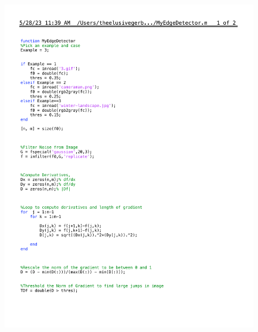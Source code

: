 \documentclass[12pt]{article}
\begin{document}
\begin{enumerate}[label=\bfseries Problem \arabic*:]
\begin{figure}[H]
\begin{subfigure}[t!]{.5\textwidth}
        \end{subfigure}%
    \end{figure}
    \begin{figure}
        \includegraphics[width=\linewidth]{MyEdgeDetector_code.pdf}
    \end{figure}    





\end{enumerate}
\end{document}

